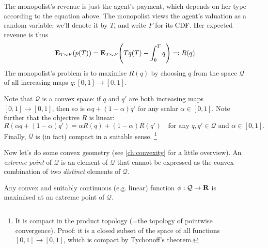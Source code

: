 The monopolist's revenue is just the agent's payment, which depends on her type according to the equation above.
The monopolist views the agent's valuation as a random variable; we'll denote it by $T$, and write $F$ for its CDF.
Her expected revenue is thus
%
\begin{equation*}
	\E_{T \sim F}( p(T) )
	= \E_{T \sim F}\left( T q(T) - \int_0^T q \right)
	\eqqcolon R(q) .
\end{equation*}
%
The monopolist's problem is to maximise $R(q)$
by choosing $q$ from the space $\mathcal{Q}$ of all increasing maps $q : [0,1] \to [0,1]$.

Note that $\mathcal{Q}$ is a convex space: if $q$ and $q'$ are both increasing maps $[0,1] \to [0,1]$, then so is $\alpha q + (1-\alpha) q'$ for any scalar $\alpha \in [0,1]$.
Note further that the objective $R$ is linear:
%
\begin{equation*}
	R( \alpha q + (1-\alpha) q' ) = \alpha R(q) + (1-\alpha) R(q') 
	\quad \text{for any $q,q' \in \mathcal{Q}$ and $\alpha \in [0,1]$.}
\end{equation*}
%
Finally, $\mathcal{Q}$ is (in fact) compact in a suitable sense.%
	\footnote{It is compact in the product topology (=the topology of pointwise convergence).
	Proof: it is a closed subset of the space of all functions $[0,1] \to [0,1]$, which is compact by Tychonoff's theorem.}

Now let's do some convex geometry (see \cref{ch:convexity} for a little overview).
An \emph{extreme point} of $\mathcal{Q}$ is an element of $\mathcal{Q}$ that cannot be expressed as the convex combination of two \emph{distinct} elements of $\mathcal{Q}$.

\begin{observation}
	\label{observation:bauer}
	Any convex and suitably continuous (e.g. linear) function $\phi : \mathcal{Q} \to \mathbf{R}$
	is maximised at an extreme point of $\mathcal{Q}$.
\end{observation}

